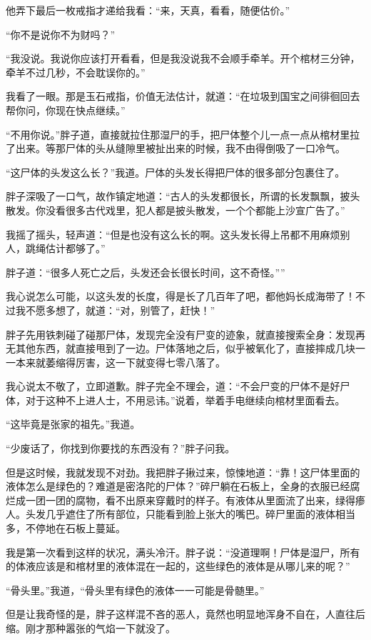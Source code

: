 他弄下最后一枚戒指才递给我看：“来，天真，看看，随便估价。”

“你不是说你不为财吗？”

“我没说。我说你应该打开看看，但是我没说我不会顺手牵羊。开个棺材三分钟，牵羊不过几秒，不会耽误你的。”

我看了一眼。那是玉石戒指，价值无法估计，就道：“在垃圾到国宝之间徘徊回去帮你问，你现在快点继续。”

“不用你说。”胖子道，直接就拉住那湿尸的手，把尸体整个儿一点一点从棺材里拉了出来。等那尸体的头从缝隙里被扯出来的时候，我不由得倒吸了一口冷气。

“这尸体的头发这么长？”我道。尸体的头发长得把尸体的很多部分包裹住了。

胖子深吸了一口气，故作镇定地道：“古人的头发都很长，所谓的长发飘飘，披头散发。你没看很多古代戏里，犯人都是披头散发，一个个都能上沙宣广告了。”

我摇了摇头，轻声道：“但是也没有这么长的啊。这头发长得上吊都不用麻烦别人，跳绳估计都够了。”

胖子道：“很多人死亡之后，头发还会长很长时间，这不奇怪。””

我心说怎么可能，以这头发的长度，得是长了几百年了吧，都他妈长成海带了！不过我不愿多想了，就道：“对，别管了，赶快！”

胖子先用铁刺碰了碰那尸体，发现完全没有尸变的迹象，就直接搜索全身：发现再无其他东西，就直接甩到了一边。尸体落地之后，似乎被氧化了，直接摔成几块一一本来就萎缩得厉害，这一下就变得七零八落了。

我心说太不敬了，立即道歉。胖子完全不理会，道：“不会尸变的尸体不是好尸体，对于这种不上进人士，不用忌讳。”说着，举着手电继续向棺材里面看去。

“这毕竟是张家的祖先。”我道。

“少废话了，你找到你要找的东西没有？”胖子问我。

但是这时候，我就发现不对劲。我把胖子揪过来，惊悚地道：“靠！这尸体里面的液体怎么是绿色的？难道是密洛陀的尸体？”碎尸躺在石板上，全身的衣服已经腐烂成一团一团的腐物，看不出原来穿戴时的样子。有液体从里面流了出来，绿得瘆人。头发几乎遮住了所有部位，只能看到脸上张大的嘴巴。碎尸里面的液体相当多，不停地在石板上蔓延。

我是第一次看到这样的状况，满头冷汗。胖子说：“没道理啊！尸体是湿尸，所有的体液应该是和棺材里的液体混在一起的，这些绿色的液体是从哪儿来的呢？”

“骨头里。”我道，“骨头里有绿色的液体一一可能是骨髄里。”

但是让我奇怪的是，胖子这样混不吝的恶人，竟然也明显地浑身不自在，人直往后缩。刚才那种嚣张的气焰一下就没了。

